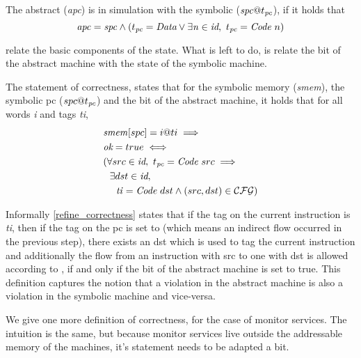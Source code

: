 \begin{definition}[PC simulation]
  \label{refine_pc}
  The abstract \pc (\textit{apc}) is in simulation with the symbolic \pc
  ($\mathit{spc}@t_{\textit{pc}}$), if it holds that
  $$\mathit{apc} = \mathit{spc} \land
    (t_{\textit{pc}} = \textit{Data} \lor \exists\mathit{n \in \textit{id}},~
    t_{\textit{pc}} = \textit{Code}~n)$$
\end{definition}

 relate the basic
components of the state.  What is left to do, is relate the \ok bit of
the abstract machine with the state of the symbolic machine.

\begin{definition}[Correctness]
  \label{refine_correctness}
  The statement of correctness, states that for the symbolic memory
  (\textit{smem}), the symbolic pc ($spc@t_{\textit{pc}}$) and the \ok bit
  of the abstract machine, it holds that for all words \textit{i} and
  tags \textit{ti},
  \begin{align*}
     & \mathit{smem}[spc] = i@ti \implies \\
     & \textit{ok} = true  \iff \\
     & (\forall src \in \textit{id}, ~ t_{\textit{pc}} = \textit{Code}~src \implies  \\
     & ~~\exists dst \in \textit{id}, \\
     & ~~~~ \mathit{ti} = \textit{Code}~dst \land (src,dst) \in \mathcal{CFG})
    \end{align*}
\end{definition}

Informally \cref{refine_correctness} states that if the tag on the
current instruction is \textit{ti}, then if the tag on the pc is set
to  (which means an indirect flow occurred in the previous
step), there exists an \id dst which is used to tag the current
instruction and additionally the flow from an instruction with \id src
to one with \id dst is allowed according to \CFG, if and only if the
\ok bit of the abstract machine is set to true. This definition
captures the notion that a violation in the abstract machine is also a
violation in the symbolic machine and vice-versa.

We give one more definition of correctness, for the case of monitor
services. The intuition is the same, but because monitor services
live outside the addressable memory of the machines, it's statement
needs to be adapted a bit.

